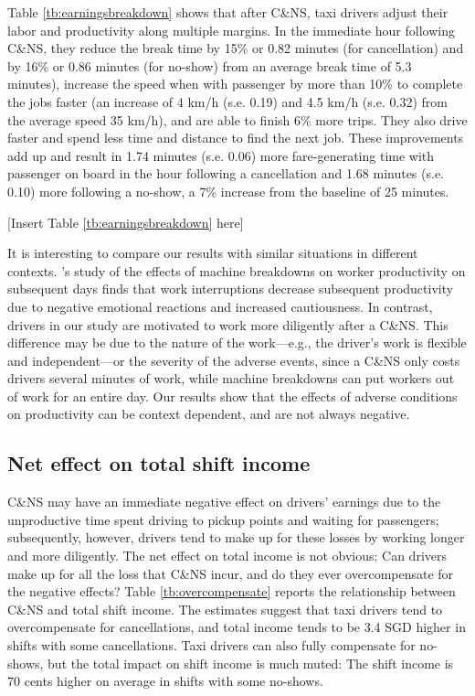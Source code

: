 \documentclass[reviewmode,AEJ]{AEA}
\begin{document}
Table \ref{tb:earningsbreakdown} shows that after C\&NS, taxi drivers adjust their labor and productivity along multiple margins. In the immediate hour following C\&NS, they reduce the break time by 15\% or 0.82 minutes (for cancellation) and by 16\% or 0.86 minutes (for no-show) from an average break time of 5.3 minutes), increase the speed when with passenger by more than 10\% to complete the jobs faster (an increase of 4 km/h (s.e. 0.19) and 4.5 km/h (s.e. 0.32) from the average speed 35 km/h), and are able to finish 6\% more trips. They also drive faster and spend less time and distance to find the next job. These improvements add up and result in 1.74 minutes (s.e. 0.06) more fare-generating time with passenger on board in the hour following a cancellation and 1.68 minutes (s.e. 0.10) more following a no-show, a 7\% increase from the baseline of 25 minutes.  

\begin{center}
	[Insert Table \ref{tb:earningsbreakdown} here]
\end{center}


It is interesting to compare our results with similar situations in different contexts. 
\citeauthor{cai2017recover}'s \citeyear{cai2017recover} study of the effects of  machine breakdowns on worker 
productivity on subsequent days finds that work interruptions decrease subsequent productivity due to
negative emotional reactions and increased cautiousness. In contrast, drivers in our study are motivated 
to work more diligently after a C\&NS. This difference may be due to the nature of the work---e.g., the 
driver's work is flexible and independent---or the severity of the adverse events, since a C\&NS only costs
drivers several minutes of work, while machine breakdowns can put workers out of work for an entire day.
Our results show that the 
effects of adverse conditions on productivity can be context dependent,
and are not always negative.

\subsection{Net effect on total shift income}

C\&NS may have an immediate negative effect on drivers' earnings due to the 
unproductive time spent driving to pickup points and waiting for passengers; subsequently, however, 
drivers tend to make up for these losses by working longer and more diligently. The net effect on total
income is not obvious: Can drivers make up for all the loss that C\&NS incur, and do they ever 
overcompensate for the negative effects? Table \ref{tb:overcompensate} reports the relationship between 
C\&NS and total shift income.
The estimates suggest that taxi drivers tend to overcompensate for cancellations,
and total income tends to be 3.4 SGD higher in shifts with some cancellations.
Taxi drivers can also fully compensate for no-shows, but the total impact on shift income is much muted:
The shift income is 70 cents higher on average in shifts with some no-shows.
\end{document}
